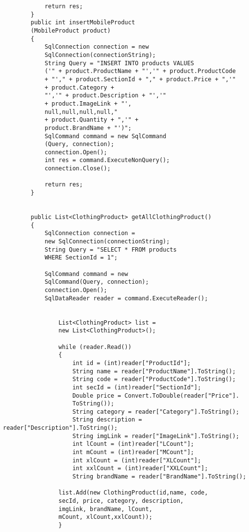 \begin{lstlisting}
            return res;
        }
        public int insertMobileProduct
        (MobileProduct product)
        {
            SqlConnection connection = new 
            SqlConnection(connectionString);
            String Query = "INSERT INTO products VALUES 
            ('" + product.ProductName + "','" + product.ProductCode 
            + "'," + product.SectionId + "," + product.Price + ",'" 
            + product.Category + 
            "','" + product.Description + "','" 
            + product.ImageLink + "',
            null,null,null,null," 
            + product.Quantity + ",'" + 
            product.BrandName + "')";
            SqlCommand command = new SqlCommand
            (Query, connection);
            connection.Open();
            int res = command.ExecuteNonQuery();
            connection.Close();

            return res;
        }


        public List<ClothingProduct> getAllClothingProduct()
        {
            SqlConnection connection =
            new SqlConnection(connectionString);
            String Query = "SELECT * FROM products 
            WHERE SectionId = 1";

            SqlCommand command = new 
            SqlCommand(Query, connection);
            connection.Open();
            SqlDataReader reader = command.ExecuteReader();

          
                List<ClothingProduct> list = 
                new List<ClothingProduct>();

                while (reader.Read())
                {
                    int id = (int)reader["ProductId"];
                    String name = reader["ProductName"].ToString();
                    String code = reader["ProductCode"].ToString();
                    int secId = (int)reader["SectionId"];
                    Double price = Convert.ToDouble(reader["Price"].
                    ToString());
                    String category = reader["Category"].ToString();
                    String description = reader["Description"].ToString();
                    String imgLink = reader["ImageLink"].ToString();
                    int lCount = (int)reader["LCount"];
                    int mCount = (int)reader["MCount"];
                    int xlCount = (int)reader["XLCount"];
                    int xxlCount = (int)reader["XXLCount"];
                    String brandName = reader["BrandName"].ToString();

                list.Add(new ClothingProduct(id,name, code, 
                secId, price, category, description, 
                imgLink, brandName, lCount, 
                mCount, xlCount,xxlCount));
                }


\end{lstlisting}
